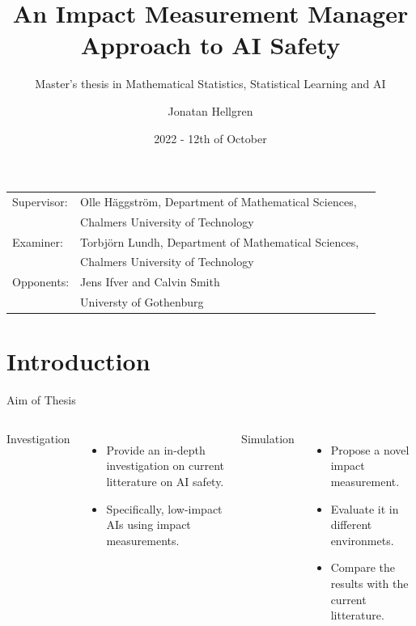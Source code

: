 \documentclass[10pt]{beamer}
\title{An Impact Measurement Manager Approach to AI Safety}
\subtitle{Master's thesis in Mathematical Statistics, Statistical Learning and AI}
\date{2022 - 12th of October}
\author{Jonatan Hellgren}
\institute{Department of Mathematical Sciences\\
Chalmers University of Technology\\
University of Gothenburg}
\begin{document}
\maketitle

\begin{frame}
  \begin{tabular}[t]{lll}
  Supervisor:& Olle Häggström, Department of Mathematical Sciences,\\
    & Chalmers University of Technology\\
  Examiner:& Torbjörn Lundh, Department of Mathematical Sciences,\\
    & Chalmers University of Technology\\
  Opponents:& Jens Ifver and Calvin Smith\\ & Universty of Gothenburg
  \end{tabular}
\end{frame}


\section{Introduction}

\begin{frame}{Aim of Thesis}
  \begin{columns}[T,onlytextwidth]

      \Large{Investigation}

      \large
      \begin{itemize}[<+- | alert@+>]
        \item Provide an in-depth investigation on current litterature on AI safety.
        \item Specifically, low-impact AIs using impact measurements.
      \end{itemize}

      \Large{Simulation}

      \large
      \begin{itemize}[<+- | alert@+>]
        \item Propose a novel impact measurement.
        \item Evaluate it in different environmets.
        \item Compare the results with the current litterature.
      \end{itemize}

  \end{columns}
\end{frame}
\end{document}
